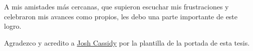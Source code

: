 \documentclass[12pt, a4paper, twoside, openright, final]{book}
\begin{document}
A mis amistades más cercanas, que supieron escuchar mis frustraciones y celebraron mis avances como propios, les debo una parte importante de este logro.

\begin{flushright}
Agradezco y acredito a \href{https://www.overleaf.com/learn/latex/How_to_Write_a_Thesis_in_LaTeX_(Part_1)%3A_Basic_Structure}{Josh Cassidy} por la plantilla de la portada de esta tesis.
\end{flushright}

\newpage
\thispagestyle{empty}

\renewcommand{\contentsname}{Contenido}
\tableofcontents %
\renewcommand{\listfigurename}{Lista de figuras}
\listoffigures

\newpage
\thispagestyle{empty}

\newpage
\thispagestyle{empty}

\mainmatter

\renewcommand{\chaptername}{Capítulo}
\renewcommand{\figurename}{Fig.}








%
%



\appendix
\renewcommand{\appendixname}{Apéndice}

% 
% 


\clearpage

\backmatter


\printglossary[
    title=Acrónimos, 
    toctitle=Acrónimos, 
    type=\acronymtype,
]

\printglossary[
    title=Glosario,
    toctitle=Glosario
]


\printnomenclature

\renewcommand\bibname{Bibliografía}


\end{document}
